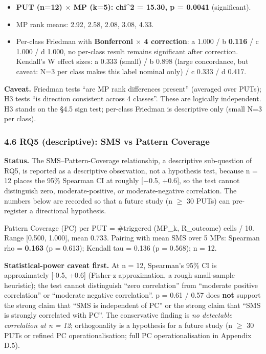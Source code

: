 \documentclass[review,12pt,authoryear]{elsarticle}
\providecommand{\tightlist}{\setlength{\itemsep}{0pt}\setlength{\parskip}{0pt}}
\begin{document}
\begin{itemize}
\tightlist
\item
  \textbf{PUT (n=12) $\times$ MP (k=5): chi\^{}2 = 15.30, p = 0.0041}
  (significant).
\item
  MP rank means: 2.92, 2.58, 2.08, 3.08, 4.33.
\item
  Per-class Friedman with \textbf{Bonferroni $\times$ 4 correction}: a
  1.000 / b \textbf{0.116} / c 1.000 / d 1.000, no per-class
  result remains significant after correction. Kendall's W effect sizes:
  a 0.333 (small) / b 0.898 (large concordance, but caveat: N=3 per
  class makes this label nominal only) / c 0.333 / d 0.417.
\end{itemize}

\textbf{Caveat.} Friedman tests ``are MP rank differences present''
(averaged over PUTs); H3 tests ``is direction consistent across 4
classes''. These are logically independent. H3 stands on the §4.5 sign
test; per-class Friedman is descriptive only (small N=3 per class).

\subsubsection{4.6 RQ5 (descriptive): SMS vs Pattern Coverage}\label{rq4-sms-vs-pattern-coverage}

\textbf{Status.} The SMS--Pattern-Coverage relationship, a descriptive
sub-question of RQ5, is reported as a descriptive observation, not a
hypothesis test, because n = 12 places the 95\% Spearman CI at roughly
{[}−0.5, +0.6{]}, so the test cannot distinguish zero,
moderate-positive, or moderate-negative correlation. The numbers below
are recorded so that a future study (n $\geq$ 30 PUTs) can pre-register a directional
hypothesis.

Pattern Coverage (PC) per PUT = \#triggered (MP\_k, R\_outcome) cells /
10. Range {[}0.500, 1.000{]}, mean 0.733. Pairing with mean SMS over 5
MPs: Spearman rho = \textbf{0.163} (p = 0.613); Kendall tau = 0.136 (p =
0.568); n = 12.

\textbf{Statistical-power caveat first.} At n = 12, Spearman's 95\% CI
is approximately {[}-0.5, +0.6{]} (Fisher-z approximation, a rough
small-sample heuristic); the test cannot distinguish ``zero
correlation'' from ``moderate positive correlation'' or ``moderate
negative correlation''. p = 0.61 / 0.57 does \textbf{not} support the
strong claim that ``SMS is independent of PC'' or the strong claim that
``SMS is strongly correlated with PC''. The conservative finding is
\emph{no detectable correlation at n = 12}; orthogonality is a
hypothesis for a future study (n $\geq$ 30 PUTs or refined PC operationalisation; full PC
operationalisation in Appendix D.5).
\end{document}
